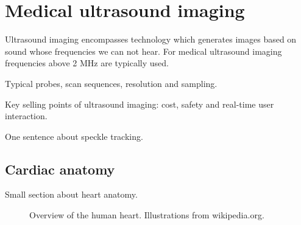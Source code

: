 \section {Medical ultrasound imaging}\label{sec:ultrasound}
Ultrasound imaging encompasses technology which generates images based on sound whose frequencies we can not hear. For medical ultrasound imaging frequencies above 2 MHz are typically used.

Typical probes, scan sequences, resolution and sampling.

Key selling points of ultrasound imaging: cost, safety and real-time user interaction.

One sentence about speckle tracking.

\subsection{Cardiac anatomy}
Small section about heart anatomy.

\begin{figure}
\centering
{}
\caption{Overview of the human heart. Illustrations from wikipedia.org.}
\label{fig:human_heart}
\end{figure}
							
